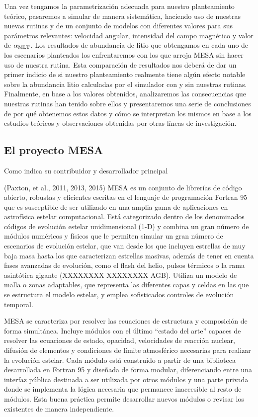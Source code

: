 Una vez tengamos la parametrización adecuada para nuestro planteamiento teórico, pasaremos a simular de manera sistemática, haciendo uso de nuestras nuevas rutinas y de un conjunto de modelos con diferentes valores para sus parámetros relevantes: velocidad angular, intensidad del campo magnético y valor de $\alpha_{\mathrm{MLT}}$. Los resultados de abundancia de litio que obtengamos en cada uno de los escenarios planteados los enfrentaremos con los que arroja MESA sin hacer uso de nuestra rutina. Esta comparación de resultados nos deberá de dar un primer indicio de si nuestro planteamiento realmente tiene algún efecto notable sobre la abundancia litio calculadas por el simulador con y sin nuestras rutinas. Finalmente, en base a los valores obtenidos, analizaremos las consecuencias que nuestras rutinas han tenido sobre ellos y presentaremos una serie de conclusiones de por qué obtenemos estos datos y cómo se interpretan los mismos en base a los estudios teóricos y observaciones obtenidas por otras líneas de investigación.\par

\subsection{El proyecto MESA}
Como indica su contribuidor y desarrollador principal \author{QUEPONERAQUÍ??} \cite[xxxxxx]{Pasetto2014} (Paxton, et al., 2011, 2013, 2015) MESA es un conjunto de librerías de código abierto, robustas y eficientes escritas en el lenguaje de programación Fortran 95 que es susceptible de ser utilizado en una amplia gama de aplicaciones en astrofísica estelar computacional. Está categorizado dentro de los denominados códigos de evolución estelar unidimensional (1-D) y combina un gran número de módulos numéricos y físicos que le permiten simular un gran número de escenarios de evolución estelar, que van desde los que incluyen estrellas de muy baja masa hasta los que caracterizan estrellas masivas, además de tener en cuenta fases avanzadas de evolución, como el flash del helio, pulsos térmicos o la rama asintótica gigante (XXXXXXXX XXXXXXXX AGB). Utiliza un modelo de malla o zonas adaptables, que representa las diferentes capas y celdas en las que se estructura el modelo estelar, y emplea sofisticados controles de evolución temporal.\par

MESA se caracteriza por resolver las ecuaciones de estructura y composición de forma simultánea. Incluye módulos con el último “estado del arte” capaces de resolver las ecuaciones de estado, opacidad, velocidades de reacción nuclear, difusión de elementos y condiciones de límite atmosférico necesarias para realizar la evolución estelar. Cada módulo está construido a partir de una biblioteca desarrollada en Fortran 95 y diseñada de forma modular, diferenciando entre una interfaz pública destinada a ser utilizada por otros módulos y una parte privada donde se implementa la lógica necesaria que permanece inaccesible al resto de módulos. Esta buena práctica permite desarrollar nuevos módulos o revisar los existentes de manera independiente.\par

